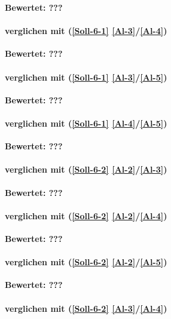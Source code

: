 \textbf{Bewertet: ???}

\paragraph*{  verglichen mit  (\ref{Soll-6-1} \ref{Al-3}/\ref{Al-4})}

\textbf{Bewertet: ???}

\paragraph*{  verglichen mit  (\ref{Soll-6-1} \ref{Al-3}/\ref{Al-5})}

\textbf{Bewertet: ???}


\paragraph*{  verglichen mit  (\ref{Soll-6-1} \ref{Al-4}/\ref{Al-5})}

\textbf{Bewertet: ???}


\paragraph*{  verglichen mit  (\ref{Soll-6-2} \ref{Al-2}/\ref{Al-3})}

\textbf{Bewertet: ???}

\paragraph*{  verglichen mit  (\ref{Soll-6-2} \ref{Al-2}/\ref{Al-4})}

\textbf{Bewertet: ???}

\paragraph*{  verglichen mit  (\ref{Soll-6-2} \ref{Al-2}/\ref{Al-5})}

\textbf{Bewertet: ???}

\paragraph*{  verglichen mit  (\ref{Soll-6-2} \ref{Al-3}/\ref{Al-4})}

